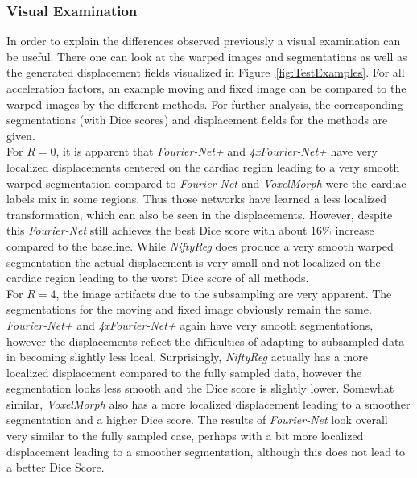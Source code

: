 \subsubsection{Visual Examination}
In order to explain the differences observed previously a visual examination can be useful. There one can look at the warped images and segmentations as well as the generated displacement fields visualized in Figure~\ref{fig:TestExamples}. For all acceleration factors, an example moving and fixed image can be compared to the warped images by the different methods. For further analysis, the corresponding segmentations (with Dice scores) and displacement fields for the methods are given.\\
For $R=0$, it is apparent that \emph{Fourier-Net+} and \emph{4xFourier-Net+} have very localized displacements centered on the cardiac region leading to a very smooth warped segmentation compared to \emph{Fourier-Net} and \emph{VoxelMorph} were the cardiac labels mix in some regions. Thus those networks have learned a less localized transformation, which can also be seen in the displacements. However, despite this \emph{Fourier-Net} still achieves the best Dice score with about $16\%$ increase compared to the baseline. While \emph{NiftyReg} does produce a very smooth warped segmentation the actual displacement is very small and not localized on the cardiac region leading to the worst Dice score of all methods.\\
For $R=4$, the image artifacts due to the subsampling are very apparent. The segmentations for the moving and fixed image obviously remain the same.
\emph{Fourier-Net+} and \emph{4xFourier-Net+} again have very smooth segmentations, however the displacements reflect the difficulties of adapting to subsampled data in becoming slightly less local. Surprisingly, \emph{NiftyReg} actually has a more localized displacement compared to the fully sampled data, however the segmentation looks less smooth and the Dice score is slightly lower. Somewhat similar, \emph{VoxelMorph} also has a more localized displacement leading to a smoother segmentation and a higher Dice score. The results of \emph{Fourier-Net} look overall very similar to the fully sampled case, perhaps with a bit more localized displacement leading to a smoother segmentation, although this does not lead to a better Dice Score.\\
